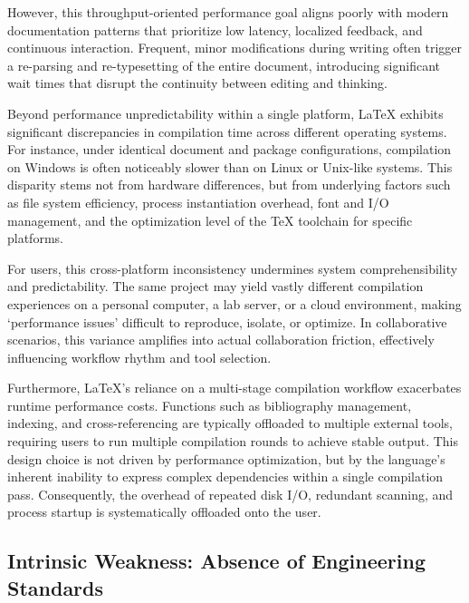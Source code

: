 However, this throughput-oriented performance goal aligns poorly with modern documentation patterns that prioritize low latency, localized feedback, and continuous interaction. Frequent, minor modifications during writing often trigger a re-parsing and re-typesetting of the entire document, introducing significant wait times that disrupt the continuity between editing and thinking.

Beyond performance unpredictability within a single platform, \LaTeX{} exhibits significant discrepancies in compilation time across different operating systems. For instance, under identical document and package configurations, compilation on Windows is often noticeably slower than on Linux or Unix-like systems. This disparity stems not from hardware differences, but from underlying factors such as file system efficiency, process instantiation overhead, font and I/O management, and the optimization level of the \TeX{} toolchain for specific platforms.

For users, this cross-platform inconsistency undermines system comprehensibility and predictability. The same project may yield vastly different compilation experiences on a personal computer, a lab server, or a cloud environment, making `performance issues' difficult to reproduce, isolate, or optimize. In collaborative scenarios, this variance amplifies into actual collaboration friction, effectively influencing workflow rhythm and tool selection.

Furthermore, \LaTeX{}'s reliance on a multi-stage compilation workflow exacerbates runtime performance costs. Functions such as bibliography management, indexing, and cross-referencing are typically offloaded to multiple external tools, requiring users to run multiple compilation rounds to achieve stable output. This design choice is not driven by performance optimization, but by the language's inherent inability to express complex dependencies within a single compilation pass. Consequently, the overhead of repeated disk I/O, redundant scanning, and process startup is systematically offloaded onto the user.

\subsection{Intrinsic Weakness: Absence of Engineering Standards}

